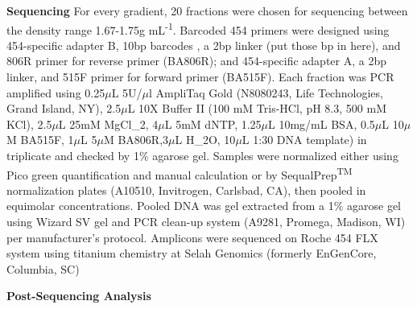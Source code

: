 \textbf{Sequencing}  For every gradient, 20 fractions were chosen for sequencing between the density range 1.67-1.75g mL\textsuperscript{-1}. Barcoded 454 primers were designed using 454-specific adapter B, 10bp barcodes \cite{Hamady_2008}, a 2bp linker (put those bp in here), and 806R primer for reverse primer (BA806R); and 454-specific adapter A, a 2bp linker, and 515F primer for forward primer (BA515F). Each fraction was PCR amplified using 0.25$\mu$L 5U/$\mu$l AmpliTaq Gold (N8080243, Life Technologies, Grand Island, NY), 2.5$\mu$L 10X Buffer II (100 mM Tris-HCl, pH 8.3, 500 mM KCl), 2.5$\mu$L 25mM MgCl_{2}, 4$\mu$L 5mM dNTP, 1.25$\mu$L 10mg/mL BSA, 0.5$\mu$L 10$\mu$M BA515F, 1$\mu$L 5$\mu$M BA806R,3$\mu$L H_{2}O, 10$\mu$L 1:30 DNA template) in triplicate and checked by 1\% agarose gel. Samples were normalized either using Pico green quantification and manual calculation or by SequalPrep\textsuperscript{TM} normalization plates (A10510, Invitrogen, Carlsbad, CA), then pooled in equimolar concentrations. Pooled DNA was gel extracted from a 1\% agarose gel using Wizard SV gel and PCR clean-up system (A9281, Promega, Madison, WI) per manufacturer's protocol.  Amplicons were sequenced on Roche 454 FLX system using titanium chemistry at Selah Genomics (formerly EnGenCore, Columbia, SC)    

\textbf{Post-Sequencing Analysis}
 